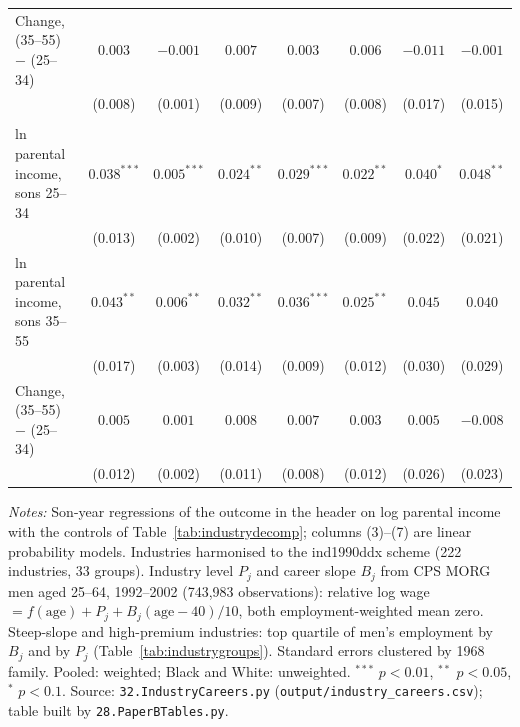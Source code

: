 \begin{table}[!htbp]
{{\begin{tabular}{lccccccc}
Change, (35--55) $-$ (25--34) & $0.003$ & $-0.001$ & $0.007$ & $0.003$ & $0.006$ & $-0.011$ & $-0.001$ \\
 & (0.008) & (0.001) & (0.009) & (0.007) & (0.008) & (0.017) & (0.015) \\
\addlinespace
\multicolumn{8}{l}{\textit{White $-$ Black}} \\
ln parental income, sons 25--34 & $0.038^{***}$ & $0.005^{***}$ & $0.024^{**}$ & $0.029^{***}$ & $0.022^{**}$ & $0.040^{*}$ & $0.048^{**}$ \\
 & (0.013) & (0.002) & (0.010) & (0.007) & (0.009) & (0.022) & (0.021) \\
ln parental income, sons 35--55 & $0.043^{**}$ & $0.006^{**}$ & $0.032^{**}$ & $0.036^{***}$ & $0.025^{**}$ & $0.045$ & $0.040$ \\
 & (0.017) & (0.003) & (0.014) & (0.009) & (0.012) & (0.030) & (0.029) \\
Change, (35--55) $-$ (25--34) & $0.005$ & $0.001$ & $0.008$ & $0.007$ & $0.003$ & $0.005$ & $-0.008$ \\
 & (0.012) & (0.002) & (0.011) & (0.008) & (0.012) & (0.026) & (0.023) \\
\bottomrule
\end{tabular}}}
\par\smallskip
\begin{minipage}{\textwidth}\footnotesize \textit{Notes:} Son-year regressions of the outcome in the header on log parental income with the controls of Table~\ref{tab:industrydecomp}; columns (3)--(7) are linear probability models. Industries harmonised to the ind1990ddx scheme (222 industries, 33 groups). Industry level $P_j$ and career slope $B_j$ from CPS MORG men aged 25--64, 1992--2002 (743,983 observations): relative log wage $= f(\text{age}) + P_j + B_j(\text{age}-40)/10$, both employment-weighted mean zero. Steep-slope and high-premium industries: top quartile of men's employment by $B_j$ and by $P_j$ (Table~\ref{tab:industrygroups}). Standard errors clustered by 1968 family. Pooled: weighted; Black and White: unweighted. $^{***}$ $p<0.01$, $^{**}$ $p<0.05$, $^{*}$ $p<0.1$. Source: \texttt{32.IndustryCareers.py} (\texttt{output/industry\_careers.csv}); table built by \texttt{28.PaperBTables.py}.\end{minipage}
\end{table}

